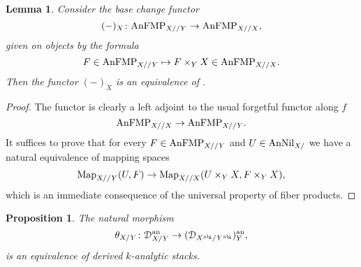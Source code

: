 \documentclass[10pt,a4paper,reqno]{amsart} %
\theoremstyle{plain}
\newtheorem{lem}[thm]{Lemma}
\newtheorem{prop}[thm]{Proposition}
\theoremstyle{definition}
\theoremstyle{remark}
\numberwithin{equation}{section}
\begin{document}
\begin{lem} \label{lem:equivalence_of_anFMP_X/ /Y_and_anFMP_X/ /X}
    Consider the base change functor
        \[
            (-)_X \colon \mathrm{AnFMP}_{X/ /Y} \to \mathrm{AnFMP}_{X/ /X},  
        \]
    given on objects by the formula
        \[
            F \in \mathrm{AnFMP}_{X/ /Y} \mapsto F \times_Y X \in \mathrm{AnFMP}_{X/ /X}.  
        \]
    Then the functor $(-)_X$ is an equivalence of \infcats.
\end{lem}

\begin{proof}
    The functor is clearly a left adjoint to the usual forgetful functor along $f$
        \[
            \mathrm{AnFMP}_{X/ /X} \to \mathrm{AnFMP}_{X/ /Y} .
        \]
    It suffices to prove that for every $F \in \mathrm{AnFMP}_{X/ /Y}$ and $U \in \mathrm{AnNil}_{X/}$ we have a natural equivalence of mapping spaces
        \[
            \operatorname{Map}_{X/ /Y}(U, F) \to \operatorname{Map}_{X/ /X}(U\times_Y X, F \times_Y X),  
        \]
    which is an immediate consequence of the universal property of fiber products.
\end{proof}

\begin{prop} \label{prop:rel_analytification_preserves_the_deformation}
    The natural morphism 
        \[
            \theta_{X/ Y}\colon\mathcal D^\mathrm{an}_{X/Y}\to(\mathcal D_{X^\mathrm{alg}/ Y^\mathrm{alg}})^\mathrm{an}_Y,
        \]
    is an equivalence of derived $k$-analytic stacks.
\end{prop}
\end{document}

